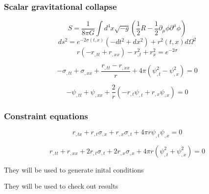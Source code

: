 \documentclass[hyperref={bookmarks=false},aspectratio=169]{beamer}
\begin{document}
\begin{frame}
  \frametitle{Scalar gravitational collapse}
  \begin{equation*}
    S=\frac{1}{8 \pi G} \int d^{4} x \sqrt{-g}\left(\frac{1}{2} R-\frac{1}{2} \partial_{\mu} \phi \partial^{\mu} \phi\right)
  \end{equation*}
  \begin{equation*}
    ds^2=e^{-2 \sigma(t, x)}\left(-d t^{2}+d x^{2}\right)+r^{2}(t, x) d \Omega^{2}
  \end{equation*}
  \begin{equation*}
    r\left(-r_{, t t}+r_{, x x}\right)-r_{, t}^{2}+r_{x}^{2}=e^{-2 \sigma}
  \end{equation*}

  \begin{equation*}
    -\sigma_{, t t}+\sigma_{,x x}+\frac{r_{, t t}-r_{,x x}}{r}+4 \pi\left(\psi_{, t}^{2}-\psi_{, x}^{2}\right)=0
  \end{equation*}

  \begin{equation*}
    -\psi_{, t t}+\psi_{,x x}+\frac{2}{r}\left(-r_{, t} \psi_{, t}+r_{, x} \psi_{, x}\right)=0
  \end{equation*}


\end{frame}

\begin{frame}
  \frametitle{Constraint equations}
  \begin{equation}
    r_{, t x}+r_{, t} \sigma_{, x}+r_{, x} \sigma_{, t}+4 \pi r \psi_{, t} \psi_{, x}=0
    \label{eqn:constraint_1}
  \end{equation}

  \begin{equation}
    r_{, t t}+r_{, x x}+2 r_{, t} \sigma_{, t}+2 r_{, x} \sigma_{, x}+4 \pi r\left(\psi_{, t}^{2}+\psi_{, x}^{2}\right)=0
    \label{eqn:constraint_2}
  \end{equation}

  They will be used to generate inital conditions

  They will be used to check out results



\end{frame}
\end{document}
